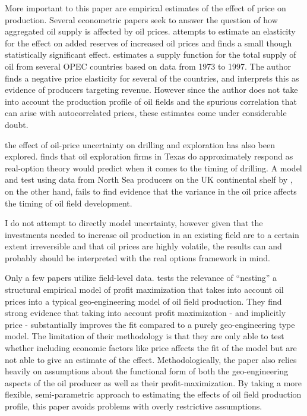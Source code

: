 \documentclass[11pt]{article}
\begin{document}
More important to this paper are empirical estimates of the effect of price on production. Several econometric papers seek to answer the question of how aggregated oil supply is affected by oil prices.  \citet{farzin_impact_2001} attempts to estimate an elasticity for the effect on added reserves of increased oil prices and finds a small though statistically significant effect.  \citet{ramcharran_oil_2002} estimates a supply function for the total supply of oil from several OPEC countries based on data from 1973 to 1997.  The author finds a negative price elasticity for several of the countries, and interprets this as evidence of producers targeting revenue.  However since the author does not take into account the production profile of oil fields and the spurious correlation that can arise with autocorrelated prices, these estimates come under considerable doubt.  

the effect of oil-price uncertainty on drilling and exploration has also been explored.  \citet{kellogg_effect_2014} finds that oil exploration firms in Texas do approximately respond as real-option theory would predict when it comes to the timing of drilling.  A model and test using data from North Sea producers on the UK continental shelf by \citet{hurn_geology_1994}, on the other hand, fails to find evidence that the variance in the oil price affects the timing of oil field development.  

I do not attempt to directly model uncertainty, however given that the investments needed to increase oil production in an existing field are to a certain extent irreversible and that oil prices are highly volatile, the results can and probably should be interpreted with the real options framework in mind.  

Only a few papers utilize field-level data.  \citet{black_is_1998} tests the relevance of “nesting” a structural empirical model of profit maximization that takes into account oil prices into a typical geo-engineering model of oil field production.  They find strong evidence that taking into account profit maximization - and implicitly price - substantially improves the fit compared to a purely geo-engineering type model.   The limitation of their methodology is that they are only able to test whether including economic factors like price affects the fit of the model but are not able to give an estimate of the effect.  Methodologically, the paper also relies heavily on assumptions about the functional form of both the geo-engineering aspects of the oil producer as well as their profit-maximization.  By taking a more flexible, semi-parametric approach to estimating the effects of oil field production profile, this paper avoids problems with overly restrictive assumptions. 
\end{document}
